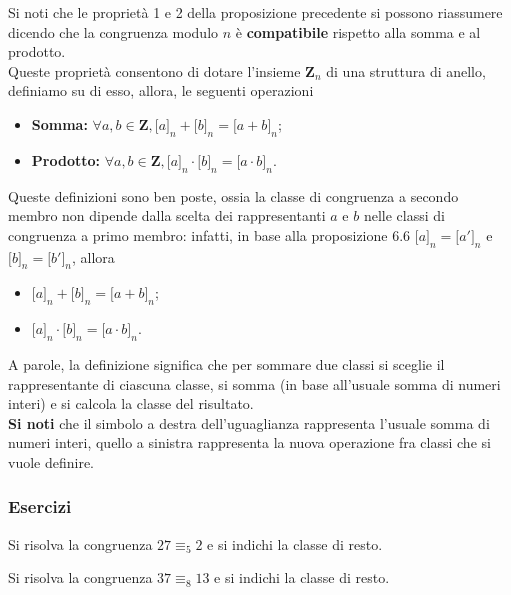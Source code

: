 \begin{flushleft}
\begin{osservazione}

\end{osservazione}
Si noti che le proprietà 1 e 2 della proposizione precedente si possono riassumere dicendo che la congruenza modulo $n$ è \textbf{compatibile} rispetto alla somma e al prodotto.\\
Queste proprietà consentono di dotare l'insieme $\mathbf{Z}_n$ di una struttura di anello, definiamo su di esso, allora, le seguenti operazioni
\begin{itemize}
    \item \textbf{Somma:} $\forall a, b \in \mathbf{Z}, \big[a\big]_n + \big[b\big]_n = \big[a+b\big]_n$;
    \item \textbf{Prodotto:} $\forall a, b \in \mathbf{Z}, \big[a\big]_n \cdot \big[b\big]_n = \big[a\cdot b\big]_n$.
\end{itemize}
Queste definizioni sono ben poste, ossia la classe di congruenza a secondo membro non dipende dalla scelta dei rappresentanti $a$ e $b$ nelle classi di congruenza a primo membro: infatti, in base alla proposizione 6.6 $\big[a\big]_n = \big[a'\big]_n$ e $\big[b\big]_n = \big[b'\big]_n$, allora
\begin{itemize}
    \item[] $\big[a\big]_n + \big[b\big]_n = \big[a+b\big]_n$;
    \item $\big[a\big]_n \cdot \big[b\big]_n = \big[a\cdot b\big]_n$.
\end{itemize}
A parole, la definizione significa che per sommare due classi si sceglie il rappresentante di ciascuna classe, si somma (in base all'usuale somma di numeri interi) e si calcola la classe del risultato.\\
\textbf{Si noti} che il simbolo a destra dell'uguaglianza rappresenta l'usuale somma di numeri interi, quello a sinistra rappresenta la nuova operazione fra classi che si vuole definire.

\subsubsection{Esercizi}
\begin{esercizio}
Si risolva la congruenza $27 \equiv_5 2$ e si indichi la classe di resto.
\end{esercizio}
\vspace{150px}

\begin{esercizio}
Si risolva la congruenza $37 \equiv_8 13$ e si indichi la classe di resto.
\end{esercizio}
\vspace{150px}



\end{flushleft}
